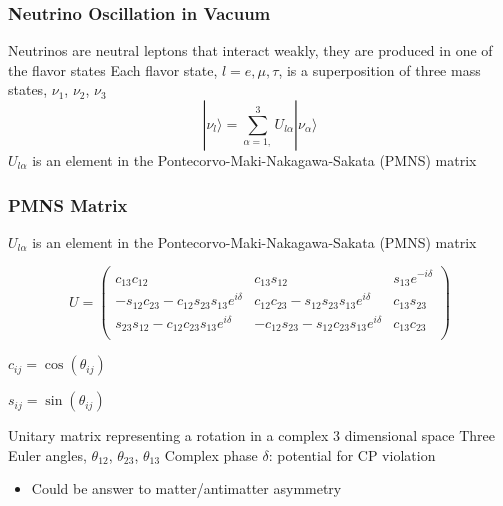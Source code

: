\documentclass[10pt,professionalfonts,xcolor=table]{beamer}
\begin{document}
\frame
{
  \frametitle{Neutrino Oscillation in Vacuum}
  \begin{itemize}
  \bang Neutrinos are neutral leptons that interact weakly, they are produced in one of the flavor states
  \gap
  \bang Each flavor state, $l=e,\mu,\tau$,  is a superposition of three mass states, $\nu_1$, $\nu_2$, $\nu_3$
  \gap
  \begin{equation*}
|\nu_l \rangle = \sum_{\alpha = 1,}^3 U_{l\alpha}|\nu_\alpha \rangle
  \end{equation*}
  \gap
  \bang $U_{l\alpha}$ is an element in the Pontecorvo-Maki-Nakagawa-Sakata (PMNS) matrix
  \end{itemize}

}


\frame
{
  \frametitle{PMNS Matrix}
  \begin{itemize}
  \bang $U_{l\alpha}$ is an element in the Pontecorvo-Maki-Nakagawa-Sakata (PMNS) matrix
  \end{itemize}
  \begin{equation*}
 U = \begin{pmatrix} \label{pmns}
c_{13}c_{12}              &    c_{13}s_{12} 	   	 & 		s_{13} e^{-i\delta} \\
-s_{12}c_{23} - c_{12}s_{23}s_{13}e^{i\delta}	& c_{12}c_{23} - s_{12}s_{23}s_{13}e^{i\delta} 				& 		c_{13}s_{23}  \\
s_{23}s_{12} - c_{12}c_{23}s_{13}e^{i\delta}	& -c_{12}s_{23} - s_{12}c_{23}s_{13}e^{i\delta} 				& 		c_{13}c_{23}  \\
\end{pmatrix}
\end{equation*}
\begin{center}
\footnotesize
$c_{ij} = \cos(\theta_{ij})$

$s_{ij} = \sin(\theta_{ij})$
\end{center}
 \gap
  \begin{itemize}
\bang Unitary matrix representing a rotation in a complex 3 dimensional space
\gap
\bang Three Euler angles, $\theta_{12}$, $\theta_{23}$, $\theta_{13}$
\gap
\bang Complex phase $\delta$: potential for CP violation
  \begin{itemize}
  \item Could be answer to matter/antimatter asymmetry
  \end{itemize}
  \end{itemize}
}
\end{document}

